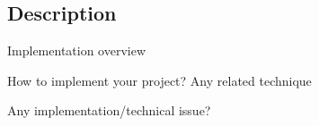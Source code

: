 \subsection{Description}


Implementation overview

How to implement your project?
  Any related technique

Any implementation/technical issue?
